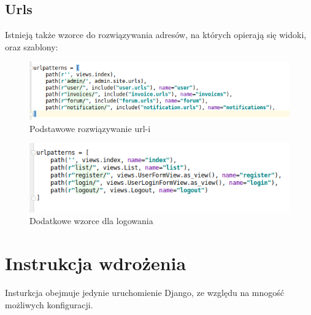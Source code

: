 \documentclass[12pt]{article}
\begin{document}
\subsection{Urls}
Istnieją także wzorce do rozwiązywania adresów, na których opierają się widoki, oraz szablony:
\begin{figure}[H]
	\centering
	\includegraphics[scale=0.7]{img/c_urls.png}
	\caption{Podstawowe rozwiązywanie url-i}
\end{figure}
\begin{figure}[H]
	\centering
	\includegraphics[scale=0.7]{img/c_user_urls.png}
	\caption{Dodatkowe wzorce dla logowania}
\end{figure}

\section{Instrukcja wdrożenia}
Insturkcja obejmuje jedynie uruchomienie Django, ze względu na mnogość możliwych konfiguracji.
\end{document}
